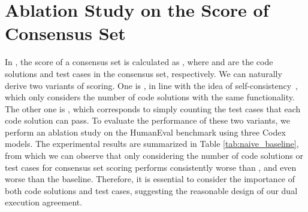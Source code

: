 \begin{table}[t]
    \centering
    \caption{Pass@ () on the HumanEval benchmark with ranking only on the number of code solutions () or test cases () in a consensus set. The numbers in {\textcolor{red}{red}} and {\textcolor[rgb]{0,0.392,0}{green}} indicate the absolute improvements over baseline and \ours, respectively.}
    \label{tab:naive_baseline}
\end{table}

\section{Ablation Study on the Score of Consensus Set}
\label{appendix_simplecount}
In \ours, the score of a consensus set is calculated as , where  and  are the code solutions and test cases in the consensus set, respectively. We can naturally derive two variants of scoring.
One is , in line with the idea of self-consistency~\citep{wang2022self}, which only considers the number of code solutions with the same functionality.
The other one is , which corresponds to simply counting the test cases that each code solution can pass. 
To evaluate the performance of these two variants, we perform an ablation study on the HumanEval benchmark using three Codex models. The experimental results are summarized in Table \ref{tab:naive_baseline}, from which we can observe that only considering the number of code solutions or test cases for consensus set scoring performs consistently worse than \ours, and even worse than the baseline. Therefore, it is essential to consider the importance of both code solutions and test cases, suggesting the reasonable design of our dual execution agreement.

